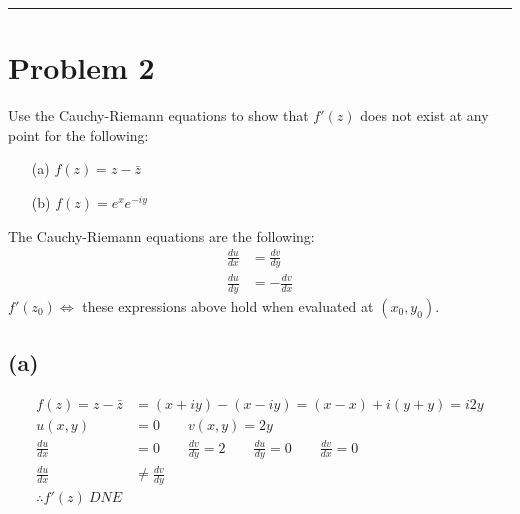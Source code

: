 \documentclass{article}
\newcommand{\der}[2]{\frac{d#1}{d#2}}
\begin{document}
\vspace{1cm}
\hrule %

\section*{Problem 2}
Use the Cauchy-Riemann equations to show that $f'(z)$ does not exist at any point for the following:

\begin{enumerate}
	\item[(a)] $f (z) = z - \bar z$
	\item[(b)] $f (z) = e^xe^{-iy}$
\end{enumerate}
The Cauchy-Riemann equations are the following:
\begin{align*}
	\der{u}{x} & = \der{v}{y}  \\
	\der{u}{y} & = -\der{v}{x}
\end{align*}
$f'(z_0)  \iff$ these expressions above hold when evaluated at $(x_0,y_0)$.

\subsection*{(a)}
\begin{align*}
	f (z) = z - \bar z & = (x+iy) - (x-iy) = (x-x) + i(y+y) = i2y                                           \\
	u(x,y)             & = 0 \quad \quad v(x,y) = 2y                                                        \\
	\der{u}{x}         & = 0 \quad \quad \der{v}{y} = 2 \quad\quad \der{u}{y} = 0 \quad\quad \der{v}{x} = 0 \\
	\der{u}{x}         & \neq \der{v}{y}                                                                    \\
	\therefore f'(z)\ DNE
\end{align*}
\end{document}
